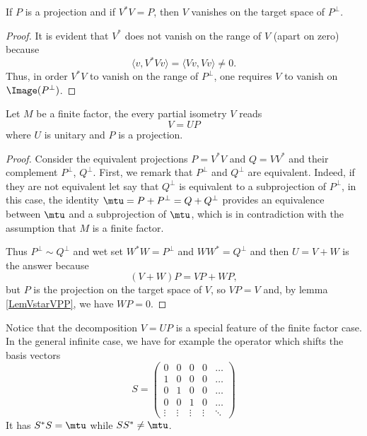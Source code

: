 \begin{lemma}	\label{LemVstarVPP}
If $P$ is a projection and if $V^*V=P$, then $V$ vanishes on the target space of $P^{\perp}$.
\end{lemma}

\begin{proof}
It is evident that $V^*$ does not vanish on the range of $V$ (apart on zero) because
\[ 
  \langle v, V^*Vv\rangle =\langle Vv, Vv\rangle \neq 0.
\]
Thus, in order $V^*V$ to vanish on the range of $P^{\perp}$, one requires $V$ to vanish on $\Image(P^{\perp})$.
\end{proof}

\begin{lemma}		\label{LemfinifactisemVUP}
Let $M$ be a finite factor, the every partial isometry $V$ reads
\begin{equation}
	V=UP
\end{equation}
where $U$ is unitary and $P$ is a projection.
\end{lemma}

\begin{proof}
Consider the equivalent projections $P=V^*V$ and $Q=VV^*$ and their complement $P^{\perp}$, $Q^{\perp}$. First, we remark that $P^{\perp}$ and $Q^{\perp}$ are equivalent. Indeed, if they are not equivalent let say that $Q^{\perp}$ is equivalent to a subprojection of $P^{\perp}$, in this case, the identity $\mtu=P+P^{\perp}=Q+Q^{\perp}$ provides an equivalence between $\mtu$ and a subprojection of $\mtu$, which is in contradiction with the assumption that $M$ is a finite factor.

Thus $P^{\perp}\sim Q^{\perp}$ and wet set $W^*W=P^{\perp}$ and $WW^*=Q^{\perp}$ and then $U=V+W$ is the answer because
\[ 
  (V+W)P=VP+WP,
\]
but $P$ is the projection on the target space of $V$, so $VP=V$ and, by lemma \ref{LemVstarVPP}, we have $WP=0$.
\end{proof}

Notice that the decomposition $V=UP$ is a special feature of the finite factor case. In the general infinite case, we have for example the operator which shifts the basis vectors
\[ 
  S=
\begin{pmatrix}
0	&0	&0	&0	&\ldots\\
1	&0	&0	&0	&\ldots\\
0	&1	&0	&0	&\ldots\\
0	&0	&1	&0	&\ldots\\
\vdots	&\vdots	&\vdots	&\vdots	&\ddots
\end{pmatrix}
\]
It has $S^*S=\mtu$ while $SS^*\neq\mtu$.

